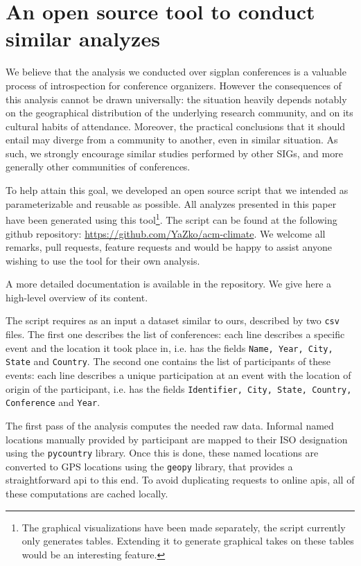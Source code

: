 \section{An open source tool to conduct similar analyzes}
\label{sec:software}

We believe that the analysis we conducted over sigplan conferences is a valuable
process of introspection for conference organizers. However the consequences of
this analysis cannot be drawn universally: the situation heavily depends notably
on the geographical distribution of the underlying research community, and on its
cultural habits of attendance. Moreover, the practical conclusions that it should
entail may diverge from a community to another, even in similar situation.
As such, we strongly encourage similar studies performed by other SIGs, and more
generally other communities of conferences.

To help attain this goal, we developed an open source \python{} script that we
intended as parameterizable and reusable as possible. All analyzes presented in
this paper have been generated using this tool\footnote{The graphical
  visualizations have been made separately, the script currently only generates
  tables. Extending it to generate graphical takes on these tables would be an
  interesting feature.}. The script can be found at the following github repository:
\url{https://github.com/YaZko/acm-climate}.
We welcome all remarks, pull requests, feature requests and would be happy to assist
anyone wishing to use the tool for their own analysis.

A more detailed documentation is available in the repository. We give here a high-level overview
of its content.

The script requires as an input a dataset similar to ours, described by two
\texttt{csv} files. The first one describes the list of conferences: each line
describes a specific event and the location it took place in, i.e. has the
fields \texttt{Name, Year, City, State} and \texttt{Country}. The second one
contains the list of participants of these events: each line describes a unique
participation at an event with the location of origin of the participant, i.e.
has the fields \texttt{Identifier, City, State, Country, Conference} and
\texttt{Year}.

The first pass of the analysis computes the needed raw data. 
Informal named locations manually provided by participant are mapped to their
ISO designation using the \texttt{pycountry} library.
Once this is done, these named locations are converted to GPS
locations using the \texttt{geopy} library, that provides a straightforward api
to this end.
To avoid duplicating requests to online apis, all of these computations are cached
locally.

